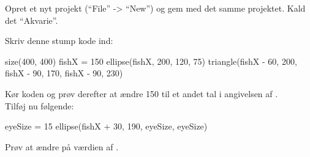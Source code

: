 \documentclass{ucph-handout}
\newcounter{handout}
\newcommand{\Ark}{Ark \#\arabic{handout} -- }
\renewcommand{\Title}{\Ark Tegn med Processing.py}%
\begin{document}
\newpage
{}
\renewcommand{\Title}{\Ark Variable}%
\begin{exercisebox}[adjusted title=Tegn en simpel fisk]
Opret et nyt projekt (``File'' -> ``New'') og gem med det samme
projektet. Kald det ``Akvarie''.

\noindent
Skriv denne stump kode ind:
\begin{python}
size(400, 400)
fishX = 150
ellipse(fishX, 200, 120, 75)
triangle(fishX - 60, 200, fishX - 90, 170, fishX - 90, 230)
\end{python}
Kør koden og prøv derefter at ændre 150 til et andet tal i angivelsen af .\\

\noindent
Tilføj nu følgende:
\begin{python}
eyeSize = 15
ellipse(fishX + 30, 190, eyeSize, eyeSize)
\end{python}
Prøv at ændre på værdien af .
\end{exercisebox}
\end{document}
